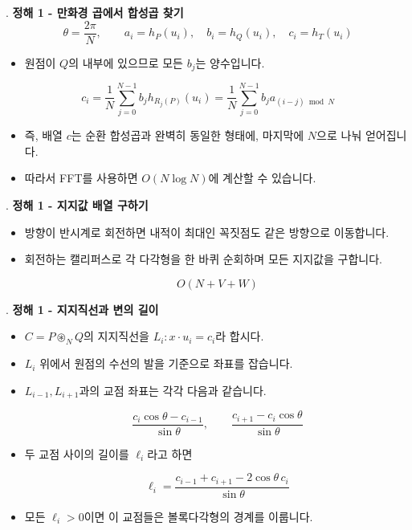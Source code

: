 \begin{frame}{\textbf{\pletter}. \ptitle}
    \textbf{정해 1 - 만화경 곱에서 합성곱 찾기}
    \[
        \theta=\frac{2\pi}{N},\qquad
        a_i=h_P(u_i),\quad b_i=h_Q(u_i),\quad c_i=h_T(u_i)
    \]
    \begin{itemize}
        \item 원점이 $Q$의 내부에 있으므로 모든 $b_j$는 양수입니다.
    \end{itemize}
    \[
        c_i
        =\frac1N\sum_{j=0}^{N-1}b_jh_{R_j(P)}(u_i)
        =\frac1N\sum_{j=0}^{N-1}b_ja_{(i-j)\bmod N}
    \]
    \begin{itemize}
        \item 즉, 배열 $c$는 순환 합성곱과 완벽히 동일한 형태에, 마지막에 $N$으로 나눠 얻어집니다.
        \item 따라서 FFT를 사용하면 $O(N\log N)$에 계산할 수 있습니다.
    \end{itemize}
\end{frame}

\begin{frame}{\textbf{\pletter}. \ptitle}
    \textbf{정해 1 - 지지값 배열 구하기}
    \begin{itemize}
        \item 방향이 반시계로 회전하면 내적이 최대인 꼭짓점도 같은 방향으로 이동합니다.
        \item 회전하는 캘리퍼스로 각 다각형을 한 바퀴 순회하며 모든 지지값을 구합니다.
    
    \[
        \boxed{O(N+V+W)}
    \]
    \end{itemize}
\end{frame}

\begin{frame}{\textbf{\pletter}. \ptitle}
    \textbf{정해 1 - 지지직선과 변의 길이}
    \begin{itemize}
        \setlength{\abovedisplayskip}{5pt}
        \setlength{\belowdisplayskip}{5pt}
        \item $C=P\circledast_N Q$의 지지직선을 $L_i:x\cdot u_i=c_i$라 합시다.
        \item $L_i$ 위에서 원점의 수선의 발을 기준으로 좌표를 잡습니다.
        \item $L_{i-1},L_{i+1}$과의 교점 좌표는 각각 다음과 같습니다.
    
    \[
        \frac{c_i\cos\theta-c_{i-1}}{\sin\theta},
        \qquad
        \frac{c_{i+1}-c_i\cos\theta}{\sin\theta}
    \]
    
        \item 두 교점 사이의 길이를 $\ell_i$라고 하면
    
    \[
        \ell_i
        =\frac{c_{i-1}+c_{i+1}-2\cos\theta\,c_i}{\sin\theta}
    \]
    
        \item 모든 $\ell_i>0$이면 이 교점들은 볼록다각형의 경계를 이룹니다.
    \end{itemize}
\end{frame}

